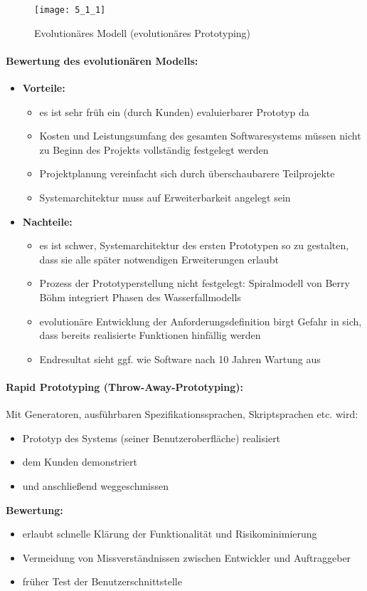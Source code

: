 \begin{figure}[h]
	\centering
	\caption{Evolutionäres Modell (evolutionäres Prototyping)}
	\texttt{[image: 5\_1\_1]}
\end{figure}

\paragraph{Bewertung des evolutionären Modells:}
\begin{itemize}
	\item \textbf{Vorteile:}
	\begin{itemize}
		\item es ist sehr früh ein (durch Kunden) evaluierbarer Prototyp da
		\item Kosten und Leistungsumfang des gesamten Softwaresystems müssen nicht zu Beginn des Projekts vollständig festgelegt werden
		\item Projektplanung vereinfacht sich durch überschaubarere Teilprojekte
		\item  Systemarchitektur muss auf Erweiterbarkeit angelegt sein
	\end{itemize}
	\item \textbf{Nachteile:}
	\begin{itemize}
		\item es ist schwer, Systemarchitektur des ersten Prototypen so zu gestalten, dass sie alle später notwendigen Erweiterungen erlaubt
		\item Prozess der Prototyperstellung nicht festgelegt: Spiralmodell von Berry Böhm integriert Phasen des Wasserfallmodells
		\item evolutionäre Entwicklung der Anforderungsdefinition birgt Gefahr in sich, dass bereits realisierte Funktionen hinfällig werden
		\item  Endresultat sieht ggf. wie Software nach 10 Jahren Wartung aus
	\end{itemize}
\end{itemize}

\paragraph{Rapid Prototyping (Throw-Away-Prototyping):}
Mit Generatoren, ausführbaren Spezifikationssprachen, Skriptsprachen etc. wird:
\begin{itemize}
	\item Prototyp des Systems (seiner Benutzeroberfläche) realisiert
	\item dem Kunden demonstriert
	\item und anschließend weggeschmissen
\end{itemize}
\textbf{Bewertung:}
\begin{itemize}
	\item erlaubt schnelle Klärung der Funktionalität und Risikominimierung
	\item Vermeidung von Missverständnissen zwischen Entwickler und Auftraggeber
	\item früher Test der Benutzerschnittstelle
\end{itemize}

